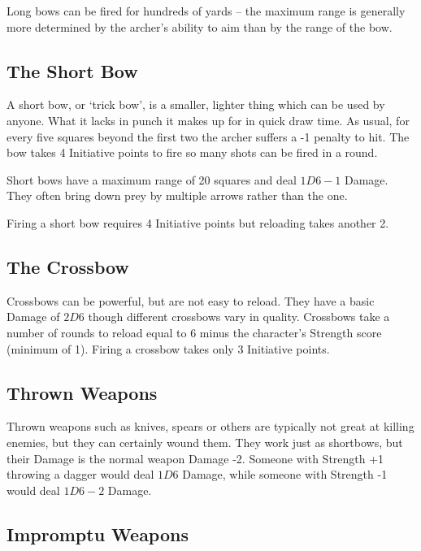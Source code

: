 \begin{multicols}{2}
Long bows can be fired for hundreds of yards -- the maximum range is generally more determined by the archer's ability to aim than by the range of the bow.

\subsection{The Short Bow}

A short bow, or `trick bow', is a smaller, lighter thing which can be used by anyone. What it lacks in punch it makes up for in quick draw time. As usual, for every five squares beyond the first two the archer suffers a -1 penalty to hit. The bow takes 4 Initiative points to fire so many shots can be fired in a \gls{round}.

Short bows have a maximum range of 20 squares and deal $1D6-1$ Damage. They often bring down prey by multiple arrows rather than the one.

Firing a short bow requires 4 Initiative points but reloading takes another 2.

\subsection{The Crossbow}
\label{crossbow}
Crossbows can be powerful, but are not easy to reload. They have a basic Damage of $2D6$ though different crossbows vary in quality. Crossbows take a number of \glspl{round} to reload equal to 6 minus the character's Strength score (minimum of 1).
Firing a crossbow takes only 3 Initiative points.

\subsection{Thrown Weapons}

Thrown weapons such as knives, spears or others are typically not great at killing enemies, but they can certainly wound them. They work just as shortbows, but their Damage is the normal weapon Damage -2. Someone with Strength +1 throwing a dagger would deal $1D6$ Damage, while someone with Strength -1 would deal $1D6-2$ Damage.

\subsection{Impromptu Weapons}


\end{multicols}
